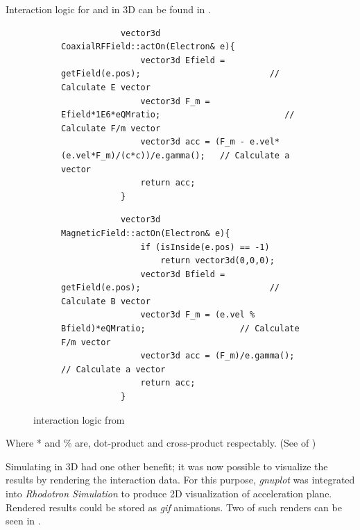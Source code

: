 \documentclass[a4paper,oneside,12pt]{report}
\numberwithin{equation}{chapter}
\begin{document}
Interaction logic for \eE and \eB in 3D can be found in .
\begin{figure}[H]
    \captionsetup[subfigure]{justification=centering}
    \captionsetup{justification=centering}
    \begin{subfigure}{\textwidth}
        \begin{verbatim}
            vector3d CoaxialRFField::actOn(Electron& e){
                vector3d Efield = getField(e.pos);                          // Calculate E vector
                vector3d F_m = Efield*1E6*eQMratio;                         // Calculate F/m vector
                vector3d acc = (F_m - e.vel*(e.vel*F_m)/(c*c))/e.gamma();   // Calculate a vector
                return acc;
            }
        \end{verbatim}
    \end{subfigure}

    \begin{subfigure}{\textwidth}
        \begin{verbatim}
            vector3d MagneticField::actOn(Electron& e){
                if (isInside(e.pos) == -1)
                    return vector3d(0,0,0);
                vector3d Bfield = getField(e.pos);                          // Calculate B vector
                vector3d F_m = (e.vel % Bfield)*eQMratio;                   // Calculate F/m vector
                vector3d acc = (F_m)/e.gamma();                             // Calculate a vector
                return acc;
            }
        \end{verbatim}
    \end{subfigure}
    \caption{\eEM  interaction logic from }
    \label{fig:3D_e_EM_interaction_first}
\end{figure}

Where * and \% are, dot-product and cross-product respectably. (See  of )

Simulating in 3D had one other benefit; it was now possible to visualize the results by rendering the interaction data. 
For this purpose, \textit{gnuplot} was integrated into \textit{Rhodotron Simulation} to produce 2D visualization of acceleration plane. 
Rendered results could be stored as \textit{gif} animations. 
Two of such renders can be seen in .
\end{document}
